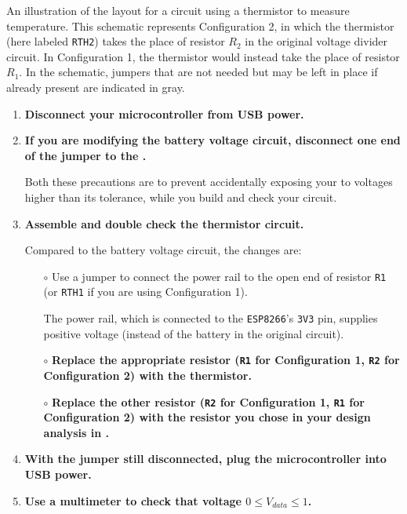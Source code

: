 \begin{marginfigure}[-8cm]
\begin{center}
		\caption[Thermistor circuit schematic]{An illustration of the layout for a circuit using a thermistor to measure temperature.
		This schematic represents Configuration 2, in which the thermistor (here labeled \texttt{RTH2}) takes the place of resistor $R_2$ in the original voltage divider circuit.
		In Configuration 1, the thermistor would instead take the place of resistor $R_1$.
		In the schematic, jumpers that are not needed but may be left in place if already present are indicated in gray.}
	\end{center}
\end{marginfigure}
\begin{enumerate}
	\item \textbf{Disconnect your microcontroller from USB power.}

	\item \textbf{If you are modifying the battery voltage circuit, disconnect one end of the jumper to the \adc.}

	Both these precautions are to prevent accidentally exposing your \adc to voltages higher than its tolerance, while you build and check your circuit.

	\item \textbf{Assemble and double check the thermistor circuit.}

Compared to the battery voltage circuit, the changes are:
	\begin{itemize}
		\item[$\circ$] Use a jumper to connect the power rail to the open end of resistor \texttt{R1} (or \texttt{RTH1} if you are using Configuration 1).

		The power rail, which is connected to the \texttt{ESP8266}'s \texttt{3V3} pin, supplies positive voltage (instead of the battery in the original circuit).
		\item[$\circ$] \textbf{Replace the appropriate resistor (\texttt{R1} for Configuration 1, \texttt{R2} for Configuration 2) with the thermistor.}
		\item[$\circ$] \textbf{Replace the other resistor (\texttt{R2} for Configuration 1, \texttt{R1} for Configuration 2) with the resistor you chose in your design analysis in .}
	\end{itemize}

	\item \textbf{With the \adc jumper still disconnected, plug the microcontroller into USB power.}

	\item \textbf{Use a multimeter to check that voltage $0 \le V_{data} \le 1$.}


\end{enumerate}
